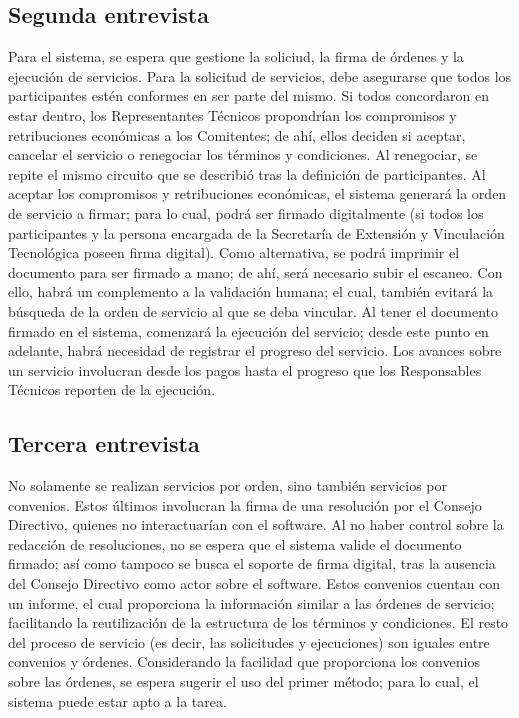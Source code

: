 \subsection{Segunda entrevista}
\normalsize{ \indent
Para el sistema, se espera que gestione la soliciud,
la firma de \'ordenes y la ejecuci\'on de servicios.
}
\newline
\normalsize{ \indent
Para la solicitud de servicios, debe asegurarse que
todos los participantes est\'en conformes en ser parte
del mismo. Si todos concordaron en estar dentro, los
Representantes T\'ecnicos propondr\'ian los compromisos
y retribuciones econ\'omicas a los Comitentes; de ah\'i,
ellos deciden si aceptar, cancelar el servicio o
renegociar los t\'erminos y condiciones. Al renegociar,
se repite el mismo circuito que se describi\'o tras la
definici\'on de participantes.
}
\newline
\normalsize{ \indent
Al aceptar los compromisos y retribuciones econ\'omicas,
el sistema generar\'a la orden de servicio a firmar;
para lo cual, podr\'a ser firmado digitalmente (si todos
los participantes y la persona encargada de la Secretar\'ia
de Extensi\'on y Vinculaci\'on Tecnol\'ogica poseen
firma digital). Como alternativa, se podr\'a imprimir
el documento para ser firmado a mano; de ah\'i, ser\'a
necesario subir el escaneo. Con ello, habr\'a un
complemento a la validaci\'on humana; el cual, tambi\'en
evitar\'a la b\'usqueda de la orden de servicio al
que se deba vincular.
}
\newline
\normalsize{ \indent
Al tener el documento firmado en el sistema, comenzar\'a
la ejecuci\'on del servicio; desde este punto en adelante,
habr\'a necesidad de registrar el progreso del servicio.
Los avances sobre un servicio involucran desde los pagos
hasta el progreso que los Responsables T\'ecnicos reporten
de la ejecuci\'on.
}
\subsection{Tercera entrevista}
\normalsize{ \indent
No solamente se realizan servicios por orden, sino tambi\'en
servicios por convenios. Estos \'ultimos involucran
la firma de una resoluci\'on por el Consejo Directivo,
quienes no interactuar\'ian con el software.
}
\newline
\normalsize{ \indent
Al no haber control sobre la redacci\'on de resoluciones,
no se espera que el sistema valide el documento firmado;
as\'i como tampoco se busca el soporte de firma digital,
tras la ausencia del Consejo Directivo como actor sobre
el software.
}
\newline
\normalsize{ \indent
Estos convenios cuentan con un informe, el cual proporciona
la informaci\'on similar a las \'ordenes de servicio;
facilitando la reutilizaci\'on de la estructura de
los t\'erminos y condiciones. El resto del proceso de
servicio (es decir, las solicitudes y ejecuciones) son
iguales entre convenios y \'ordenes.
}
\newline
\normalsize{ \indent
Considerando la facilidad que proporciona los convenios
sobre las \'ordenes, se espera sugerir el uso del primer
m\'etodo; para lo cual, el sistema puede estar apto a
la tarea.
}
